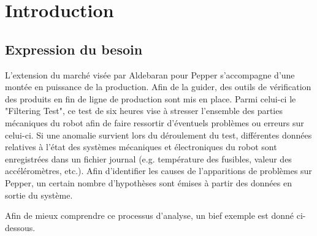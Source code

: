 \chapter{Introduction}
\label{Introduction}
\thispagestyle{fancy}

\section{Expression du besoin}
\label{Introduction:Expression du besoin}
L'extension du marché visée par Aldebaran pour Pepper s'accompagne d'une montée en puissance de la production. Afin de la guider, des outils de vérification des produits en fin de ligne de production sont mis en place. Parmi celui-ci le "Filtering Test", ce test de six heures vise à stresser l'ensemble des parties mécaniques du robot afin de faire ressortir d'éventuels problèmes ou erreurs sur celui-ci. Si une anomalie survient lors du déroulement du test, différentes données relatives à l'état des systèmes mécaniques et électroniques du robot sont enregistrées dans un fichier journal (e.g. température des fusibles, valeur des accéléromètres, etc.). Afin d'identifier les causes de l'apparitions de problèmes sur Pepper, un certain nombre d'hypothèses sont émises à partir des données en sortie du système. 

Afin de mieux comprendre ce processus d'analyse, un bief exemple est donné ci-dessous. 

